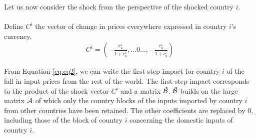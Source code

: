 \documentclass[11pt,a4paper]{article}
\begin{document}
Let us now consider the shock from the perspective of the shocked country $i$.\\
\\%
%
%
%
Define $C^i$ the vector of change in prices everywhere expressed in country $i$'s currency.\\
\begin{eqnarray*}
C^i = \left(-\frac{c_\$^i}{1+c_\$^i},\ldots0\ldots,-\frac{c_\$^i}{1+c_\$^i} \right)
\end{eqnarray*}

From Equation \ref{eq:eq2}, we can write the first-step impact for country $i$ of the fall in input prices from the rest of the world. 
The first-step impact corresponds to the product of the shock vector $C^i$ and a matrix ${\tilde{{\cal B}}}$. ${\tilde{{\cal B}}}$ builds on the large matrix ${\cal A}$ of which only the country blocks of the inputs imported by country $i$ from other countries have been retained. 
The other coefficients are replaced by 0, including those of the block of country $i$ concerning the domestic inputs of country $i$. \\
\end{document}
